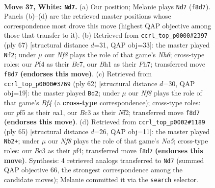 \documentclass[11pt]{article}
\begin{document}
\clearpage

\begin{figure}[p]\centering
\begin{subfigure}{0.46\textwidth}\centering
\resizebox{\linewidth}{!}{%
\newchessgame
\chessboard[
  setfen={5Nk1/8/8/3p1p2/2p2P2/1pB2n2/1P2b3/1K5B w - - 10 37},
  showmover=false,
  pgfstyle=straightmove, color=movearrow, markmove={f8-d7}
]}
\caption{}
\end{subfigure}\hfill
\begin{subfigure}{0.46\textwidth}\centering
\resizebox{\linewidth}{!}{%
\newchessgame
\chessboard[
  setfen={5k2/1b2b2p/6p1/BNp5/P1B5/1P5n/6PK/8 b - - 2 34},
  showmover=false,
  pgfstyle=straightmove, color=movearrow, markmove={h3-f2}
]}
\caption{}
\end{subfigure}
\\[4pt]
\begin{subfigure}{0.46\textwidth}\centering
\resizebox{\linewidth}{!}{%
\newchessgame
\chessboard[
  setfen={8/4b2p/6p1/5k2/1pK2B2/8/1P3NPP/n7 w - - 0 32},
  showmover=false,
  pgfstyle=straightmove, color=movearrow, markmove={f4-d2}
]}
\caption{}
\end{subfigure}\hfill
\begin{subfigure}{0.46\textwidth}\centering
\resizebox{\linewidth}{!}{%
\newchessgame
\chessboard[
  setfen={5k2/5Pp1/5b2/p2B4/np1N1P2/3K4/P6P/8 b - - 2 33},
  showmover=false,
  pgfstyle=straightmove, color=movearrow, markmove={a4-b2}
]}
\caption{}
\end{subfigure}
\caption{\textbf{Move 37, White: \texttt{Nd7}.} (a) Our position; Melanie plays \texttt{Nd7} (\texttt{f8d7}). Panels (b)--(d) are the retrieved master positions whose correspondence most drove this move (highest QAP objective among those that transfer to it). (b) Retrieved from \texttt{ccrl\_top\_p0000\#2397} (ply 67) [structural distance $d$=31, QAP obj=33]: the master played \texttt{Nf2}; under $\mu$ our \emph{Nf8} plays the role of that game's \emph{Nh6}; cross-type roles: our \emph{P}f4 as their \emph{B}e7, our \emph{B}h1 as their \emph{P}h7; transferred move \texttt{f8d7} \textbf{(endorses this move)}. (c) Retrieved from \texttt{ccrl\_top\_p0000\#3769} (ply 62) [structural distance $d$=30, QAP obj=19]: the master played \texttt{Bd2}; under $\mu$ our \emph{Nf8} plays the role of that game's \emph{Bf4} (a \textbf{cross-type} correspondence); cross-type roles: our \emph{p}f5 as their \emph{n}a1, our \emph{B}c3 as their \emph{N}f2; transferred move \texttt{f8d7} \textbf{(endorses this move)}. (d) Retrieved from \texttt{ccrl\_top\_p0002\#1189} (ply 65) [structural distance $d$=26, QAP obj=11]: the master played \texttt{Nb2+}; under $\mu$ our \emph{Nf8} plays the role of that game's \emph{Na5}; cross-type roles: our \emph{B}c3 as their \emph{p}f4; transferred move \texttt{f8d7} \textbf{(endorses this move)}. Synthesis: 4 retrieved analogs transferred to \texttt{Nd7} (summed QAP objective 66, the strongest correspondence among the candidate moves); Melanie committed it via the \texttt{search} selector.}
\label{fig:thought-m72}
\end{figure}
\end{document}
